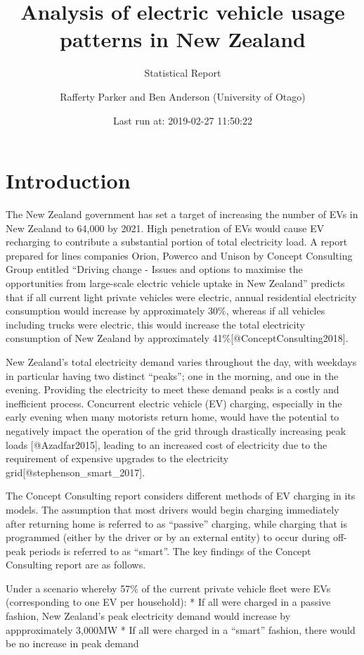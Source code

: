 \documentclass[]{article}
\title{Analysis of electric vehicle usage patterns in New Zealand}
\subtitle{Statistical Report}
\author{Rafferty Parker and Ben Anderson (University of Otago)}
\date{Last run at: 2019-02-27 11:50:22}
\begin{document}
\maketitle

{
\setcounter{tocdepth}{2}
\tableofcontents
}
\section{Introduction}\label{introduction}

The New Zealand government has set a target of increasing the number of
EVs in New Zealand to 64,000 by 2021. High penetration of EVs would
cause EV recharging to contribute a substantial portion of total
electricity load. A report prepared for lines companies Orion, Powerco
and Unison by Concept Consulting Group entitled ``Driving change -
Issues and options to maximise the opportunities from large-scale
electric vehicle uptake in New Zealand'' predicts that if all current
light private vehicles were electric, annual residential electricity
consumption would increase by approximately 30\%, whereas if all
vehicles including trucks were electric, this would increase the total
electricity consumption of New Zealand by approximately
41\%{[}@ConceptConsulting2018{]}.

New Zealand's total electricity demand varies throughout the day, with
weekdays in particular having two distinct ``peaks''; one in the
morning, and one in the evening. Providing the electricity to meet these
demand peaks is a costly and inefficient process. Concurrent electric
vehicle (EV) charging, especially in the early evening when many
motorists return home, would have the potential to negatively impact the
operation of the grid through drastically increasing peak loads
{[}@Azadfar2015{]}, leading to an increased cost of electricity due to
the requirement of expensive upgrades to the electricity
grid{[}@stephenson\_smart\_2017{]}.

The Concept Consulting report considers different methods of EV charging
in its models. The assumption that most drivers would begin charging
immediately after returning home is referred to as ``passive'' charging,
while charging that is programmed (either by the driver or by an
external entity) to occur during off-peak periods is referred to as
``smart''. The key findings of the Concept Consulting report are as
follows.

Under a scenario whereby 57\% of the current private vehicle fleet were
EVs (corresponding to one EV per household): * If all were charged in a
passive fashion, New Zealand's peak electricity demand would increase by
appproximately 3,000MW * If all were charged in a ``smart'' fashion,
there would be no increase in peak demand
\end{document}
